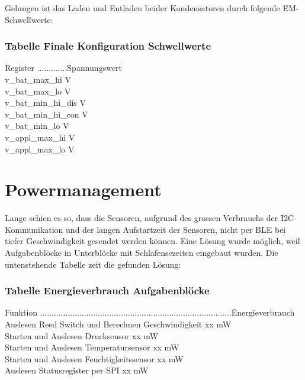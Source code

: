 Gelungen ist das Laden und Entladen beider Kondensatoren durch folgende EM-Schwellwerte:

\subsubsection*{Tabelle Finale Konfiguration Schwellwerte }
\begin{tabbing}
    Register .............\quad\= Spannungswert \\[0.8ex]
    v\_bat\_max\_hi        V \\
    v\_bat\_max\_lo        V \\
    v\_bat\_min\_hi\_dis   V \\
    v\_bat\_min\_hi\_con   V \\
    v\_bat\_min\_lo        V \\
    v\_appl\_max\_hi       V \\
    v\_appl\_max\_lo       V \\   
\end{tabbing}  


\section{Powermanagement}

Lange schien es so, dass die Sensoren, aufgrund des grossen Verbrauchs der I2C-Kommunikation und der langen Aufstartzeit der Sensoren, nicht per BLE bei tiefer Geschwindigkeit gesendet werden können. Eine Lösung wurde möglich, weil Aufgabenblöcke in Unterblöcke mit Schlafensezeiten eingebaut wurden. Die untenstehende Tabelle zeit die gefunden Lösung:

\subsubsection*{Tabelle Energieverbrauch Aufgabenblöcke}
\begin{tabbing}
    Funktion ...................................................................................\quad\= Energieverbrauch \\[0.8ex]
    Auslesen Reed Switch und Berechnen Geschwindigkeit       \> xx mW \\
    Starten und Auslesen Drucksensor          \> xx mW \\
    Starten und Auslesen Temperatursensor     \> xx mW \\
    Starten und Auslesen Feuchtigkeitssensor  \> xx mW \\
    Auslesen Statusregister per SPI           \> xx mW \\
\end{tabbing}  


